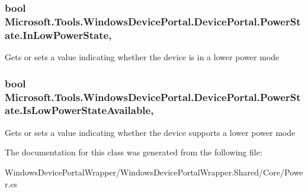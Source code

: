\subsubsection[{\texorpdfstring{In\+Low\+Power\+State}{InLowPowerState}}]{\setlength{\rightskip}{0pt plus 5cm}bool Microsoft.\+Tools.\+Windows\+Device\+Portal.\+Device\+Portal.\+Power\+State.\+In\+Low\+Power\+State\hspace{0.3cm}{\ttfamily [get]}, {\ttfamily [set]}}\hypertarget{class_microsoft_1_1_tools_1_1_windows_device_portal_1_1_device_portal_1_1_power_state_a578615fa1f1d0af9c3c5495f2ab1f1ea}{}\label{class_microsoft_1_1_tools_1_1_windows_device_portal_1_1_device_portal_1_1_power_state_a578615fa1f1d0af9c3c5495f2ab1f1ea}


Gets or sets a value indicating whether the device is in a lower power mode 

\subsubsection[{\texorpdfstring{Is\+Low\+Power\+State\+Available}{IsLowPowerStateAvailable}}]{\setlength{\rightskip}{0pt plus 5cm}bool Microsoft.\+Tools.\+Windows\+Device\+Portal.\+Device\+Portal.\+Power\+State.\+Is\+Low\+Power\+State\+Available\hspace{0.3cm}{\ttfamily [get]}, {\ttfamily [set]}}\hypertarget{class_microsoft_1_1_tools_1_1_windows_device_portal_1_1_device_portal_1_1_power_state_ac5f3c2dbef909d8504bf2c3b9ec9e459}{}\label{class_microsoft_1_1_tools_1_1_windows_device_portal_1_1_device_portal_1_1_power_state_ac5f3c2dbef909d8504bf2c3b9ec9e459}


Gets or sets a value indicating whether the device supports a lower power mode 



The documentation for this class was generated from the following file\+:\begin{DoxyCompactItemize}
\item 
Windows\+Device\+Portal\+Wrapper/\+Windows\+Device\+Portal\+Wrapper.\+Shared/\+Core/Power.\+cs\end{DoxyCompactItemize}
